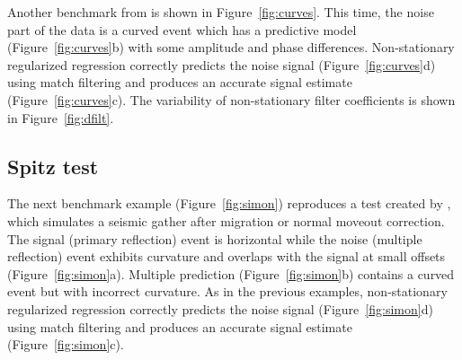 


Another benchmark from \cite{TLE24-03-02770280} is shown in
Figure~\ref{fig:curves}. This time, the noise part of the data is a
curved event which has a predictive model (Figure~\ref{fig:curves}b)
with some amplitude and phase differences. Non-stationary regularized
regression correctly predicts the noise signal
(Figure~\ref{fig:curves}d) using match filtering and produces an
accurate signal estimate (Figure~\ref{fig:curves}c). The variability
of non-stationary filter coefficients is shown in
Figure~\ref{fig:dfilt}.

\subsection{Spitz test}



The next benchmark example (Figure~\ref{fig:simon}) reproduces a test
created by \cite{simon}, which simulates a seismic gather after
migration or normal moveout correction. The signal (primary
reflection) event is horizontal while the noise (multiple reflection)
event exhibits curvature and overlaps with the signal at small offsets
(Figure~\ref{fig:simon}a). Multiple prediction
(Figure~\ref{fig:simon}b) contains a curved event but with incorrect
curvature. As in the previous examples, non-stationary regularized
regression correctly predicts the noise signal
(Figure~\ref{fig:simon}d) using match filtering and produces an
accurate signal estimate (Figure~\ref{fig:simon}c).

